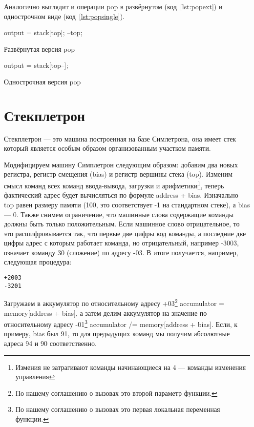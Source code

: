 \documentclass[12pt]{article}
\begin{document}
Аналогично выглядит и операции pop в развёрнутом (код~\ref{lst:popext}) и однострочном виде (код~\ref{lst:popsingle}).
\begin{listing}[H]
\begin{center}
\begin{ccode}
output = stack[top];
--top;
\end{ccode}
\end{center}
\caption{Развёрнутая версия pop}
\label{lst:popext}
\end{listing}
\begin{listing}[H]
\begin{center}
\begin{ccode}
output = stack[top--];
\end{ccode}
\end{center}
\caption{Однострочная версия pop}
\label{lst:popsingle}
\end{listing}

\section{Стекплетрон}
Стекплетрон --- это машина построенная на базе Симлетрона, она имеет стек который является особым образом организованным участком памяти. 

Модифицируем машину Симплетрон следующим образом: добавим два новых регистра, регистр смещения (bias) и регистр вершины стека (top). Изменим смысл команд всех команд ввода-вывода, загрузки и арифметики\footnote{Измения не затрагивают команды начинающиеся на 4 --- команды изменения управления}, теперь фактический адрес будет вычисляться по формуле address + bias. Изначально top равен размеру памяти (100, это соответствует -1 на стандартном стеке), а bias --- 0. 
Также снимем ограничение, что машинные слова содержащие команды должны быть только положительным. Если машинное слово отрицательное, то это расшифровывается так, что первые две цифры код команды, а последние две цифры адрес с которым работает команда, но отрицательный, например -3003, означает команду 30 (сложение) по адресу -03. В итоге получается, например, следующая процедура:
\begin{verbatim}
+2003
-3201
\end{verbatim}
Загружаем в аккумулятор по относительному адресу +03\footnote{По нашему соглашению о вызовах это второй параметр функции.} accumulator = memory[address + bias], а затем делим аккумулятор на значение по относительному адресу -01\footnote{По нашему соглашению о вызовах это первая локальная переменная функции.} accumulator /= memory[address + bias]. Если, к примеру, bias был 91, то для предыдущих команд мы получим абсолютные адреса 94 и 90 соответственно.
\end{document}
